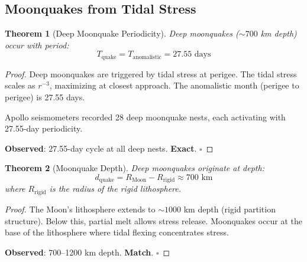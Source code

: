 \documentclass[twocolumn,10pt]{article}
\newtheorem{theorem}{Theorem}[section]
\theoremstyle{definition}
\theoremstyle{remark}
\begin{document}
\subsection{Moonquakes from Tidal Stress}

\begin{theorem}[Deep Moonquake Periodicity]
\label{thm:moonquakes}
Deep moonquakes ($\sim 700$ km depth) occur with period:
\begin{equation}
T_{\text{quake}} = T_{\text{anomalistic}} = 27.55 \text{ days}
\end{equation}
\end{theorem}

\begin{proof}
Deep moonquakes are triggered by tidal stress at perigee. The tidal stress scales as $r^{-3}$, maximizing at closest approach. The anomalistic month (perigee to perigee) is 27.55 days.

Apollo seismometers recorded 28 deep moonquake nests, each activating with 27.55-day periodicity.

\textbf{Observed}: 27.55-day cycle at all deep nests. \textbf{Exact}. $\square$
\end{proof}

\begin{theorem}[Moonquake Depth]
\label{thm:quake_depth}
Deep moonquakes originate at depth:
\begin{equation}
d_{\text{quake}} = R_{\text{Moon}} - R_{\text{rigid}} \approx 700 \text{ km}
\end{equation}
where $R_{\text{rigid}}$ is the radius of the rigid lithosphere.
\end{theorem}

\begin{proof}
The Moon's lithosphere extends to $\sim 1000$ km depth (rigid partition structure). Below this, partial melt allows stress release. Moonquakes occur at the base of the lithosphere where tidal flexing concentrates stress.

\textbf{Observed}: 700--1200 km depth. \textbf{Match}. $\square$
\end{proof}
\end{document}
